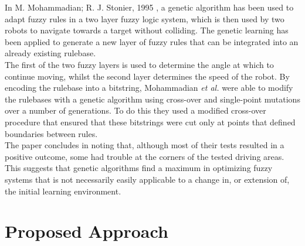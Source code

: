\documentclass[conference]{IEEEtran}
\begin{document}
In M. Mohammadian; R. J. Stonier, 1995 \cite{mohammadian1995adaptive}, a genetic algorithm has been used to adapt fuzzy rules in a two layer fuzzy logic system, which is then used by two robots to navigate towards a target without colliding.
The genetic learning has been applied to generate a new layer of fuzzy rules that can be integrated into an already existing rulebase.\\
The first of the two fuzzy layers is used to determine the angle at which to continue moving, whilst the second layer determines the speed of the robot. By encoding the rulebase into a bitstring, Mohammadian \textit{et al.}\cite{mohammadian1995adaptive} were able to modify the rulebases with a genetic algorithm using cross-over and single-point mutations over a number of generations. To do this they used a modified cross-over procedure that ensured that these bitstrings were cut only at points that defined boundaries between rules.\\
The paper concludes in noting that, although most of their tests resulted in a positive outcome, some had trouble at the corners of the tested driving areas. This suggests that genetic algorithms find a maximum in optimizing fuzzy systems that is not necessarily easily applicable to a change in, or extension of, the initial learning environment.

\section{Proposed Approach}
\end{document}
